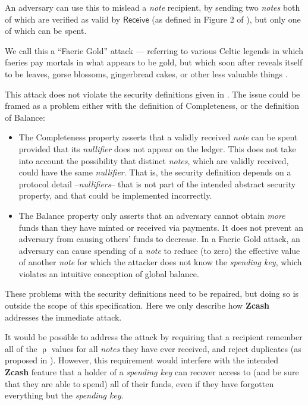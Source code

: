\documentclass{article}
\newcommand{\term}[1]{\textsl{#1}\xspace}
\newcommand{\termbf}[1]{\textbf{#1}\xspace}
\newcommand{\Zcash}{\termbf{Zcash}}
\newcommand{\coin}{\term{note}}
\newcommand{\coins}{\term{notes}}
\newcommand{\serialNumber}{\term{nullifier}}
\newcommand{\serialNumbers}{\term{nullifiers}}
\newcommand{\spendingKey}{\term{spending key}}
\newcommand{\CoinAddressRand}{\mathsf{\uprho}}
\newcommand{\Receive}{\mathsf{Receive}}
\begin{document}
An adversary can use this to mislead a \coin recipient, by sending
two \coins both of which are verified as valid by $\Receive$ (as
defined in Figure 2 of \cite{ZerocashOakland}), but only one of
which can be spent.

We call this a ``Faerie Gold'' attack --- referring to various Celtic
legends in which faeries pay mortals in what appears to be gold,
but which soon after reveals itself to be leaves, gorse blossoms,
gingerbread cakes, or other less valuable things \cite{LG2004}.

This attack does not violate the security definitions given in
\cite{ZerocashOakland}. The issue could be framed as a problem
either with the definition of Completeness, or the definition of
Balance:

\begin{itemize}
  \item The Completeness property asserts that a validly received
\coin can be spent provided that its \serialNumber does not appear
on the ledger. This does not take into account the possibility
that distinct \coins, which are validly received, could have the
same \serialNumber. That is, the security definition depends on
a protocol detail --\serialNumbers-- that is not part of the
intended abstract security property, and that could be implemented
incorrectly.
  \item The Balance property only asserts that an adversary cannot
obtain \emph{more} funds than they have minted or received via
payments. It does not prevent an adversary from causing others'
funds to decrease. In a Faerie Gold attack, an adversary can cause
spending of a \coin to reduce (to zero) the effective value of another
\coin for which the attacker does not know the \spendingKey, which
violates an intuitive conception of global balance.
\end{itemize}

These problems with the security definitions need to be repaired,
but doing so is outside the scope of this specification. Here we
only describe how \Zcash addresses the immediate attack.

It would be possible to address the attack by requiring that a
recipient remember all of the $\CoinAddressRand$ values for all
\coins they have ever received, and reject duplicates (as proposed
in \cite{GGM2016}). However, this requirement would interfere
with the intended \Zcash feature that a holder of a \spendingKey
can recover access to (and be sure that they are able to spend) all
of their funds, even if they have forgotten everything but the
\spendingKey.
\end{document}
